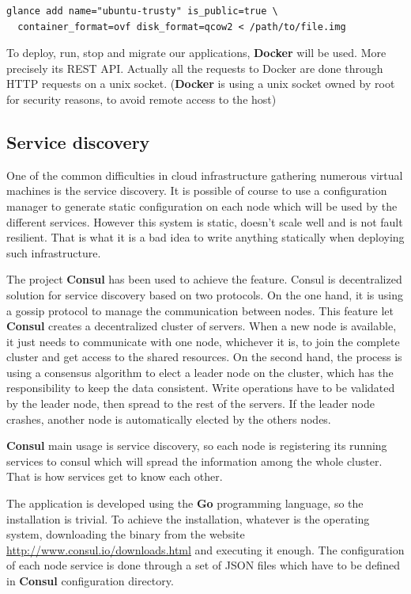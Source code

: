 \vspace{1em}
\begin{lstlisting}
glance add name="ubuntu-trusty" is_public=true \ 
  container_format=ovf disk_format=qcow2 < /path/to/file.img
\end{lstlisting}

To deploy, run, stop and migrate our applications, \textbf{Docker} will be
used. More precisely its REST API. Actually all the requests to Docker are done
through HTTP requests on a unix socket. (\textbf{Docker} is using a unix socket
owned by root for security reasons, to avoid remote access to the host)

\subsection{Service discovery}

One of the common difficulties in cloud infrastructure gathering numerous
virtual machines is the service discovery. It is possible of course to use a
configuration manager to generate static configuration on each node which will
be used by the different services. However this system is static, doesn't scale
well and is not fault resilient. That is what it is a bad idea to write
anything statically when deploying such infrastructure.

The project \textbf{Consul} has been used to achieve the feature. Consul is
decentralized solution for service discovery based on two protocols. On the one
hand, it is using a gossip protocol to manage the communication between nodes.
This feature let \textbf{Consul} creates a decentralized cluster of servers.
When a new node is available, it just needs to communicate with one node,
whichever it is, to join the complete cluster and get access to the shared
resources. On the second hand, the process is using a consensus algorithm to
elect a leader node on the cluster, which has the responsibility to keep the
data consistent. Write operations have to be validated by the leader node, then
spread to the rest of the servers. If the leader node crashes, another node is
automatically elected by the others nodes.

\textbf{Consul} main usage is service discovery, so each node is registering its
running services to consul which will spread the information among the whole
cluster. That is how services get to know each other.

The application is developed using the \textbf{Go} programming language, so
the installation is trivial. To achieve the installation, whatever is the
operating system, downloading the binary from the website
\url{http://www.consul.io/downloads.html} and executing it enough.  The
configuration of each node service is done through a set of JSON files which
have to be defined in \textbf{Consul} configuration directory.

